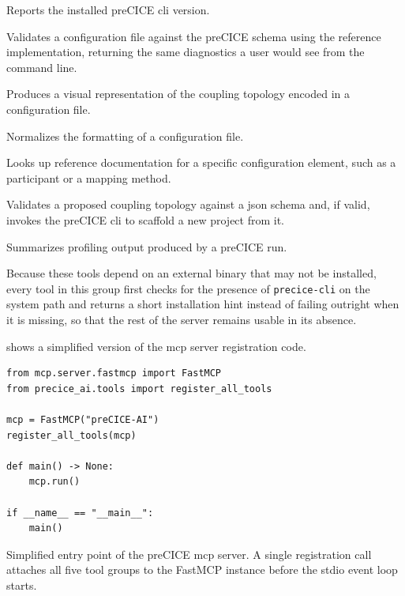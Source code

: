 \documentclass[
  numbers=noenddot,
  english,
  a4paper,
  twoside,
  bibliography=totoc,
  headsepline,
  cleardoublepage=empty,
  parskip=half,
  draft=false
]{scrbook}
\theoremstyle{break}
\renewcommand{\_}{\textunderscore\allowbreak}
\begin{document}
\begin{description}[font=\ttfamily]
  \item[precice\_version] Reports the installed preCICE \gls{cli} version.
  \item[precice\_config\_check] Validates a configuration file against the preCICE schema using
        the reference implementation, returning the same diagnostics a user would see from the
        command line.
  \item[precice\_config\_visualize] Produces a visual representation of the coupling topology
        encoded in a configuration file.
  \item[precice\_config\_format] Normalizes the formatting of a configuration file.
  \item[precice\_config\_doc] Looks up reference documentation for a specific configuration
        element, such as a participant or a mapping method.
  \item[precice\_init] Validates a proposed coupling topology against a \gls{json} schema and,
        if valid, invokes the preCICE \gls{cli} to scaffold a new project from it.
  \item[precice\_profiling\_analyze] Summarizes profiling output produced by a preCICE run.
\end{description}

Because these tools depend on an external binary that may not be installed, every tool in this
group first checks for the presence of \texttt{precice-cli} on the system path and returns a
short installation hint instead of failing outright when it is missing, so that the rest of the
server remains usable in its absence.


 shows a simplified version of the \gls{mcp} server registration code.

\begin{listing}[htbp]
\begin{verbatim}
from mcp.server.fastmcp import FastMCP
from precice_ai.tools import register_all_tools

mcp = FastMCP("preCICE-AI")
register_all_tools(mcp)

def main() -> None:
    mcp.run()

if __name__ == "__main__":
    main()
\end{verbatim}
\caption{Simplified entry point of the preCICE \gls{mcp} server. A single registration call
         attaches all five tool groups to the FastMCP instance before the stdio event loop
         starts.}
\label{lst:server-startup}
\end{listing}
\end{document}
